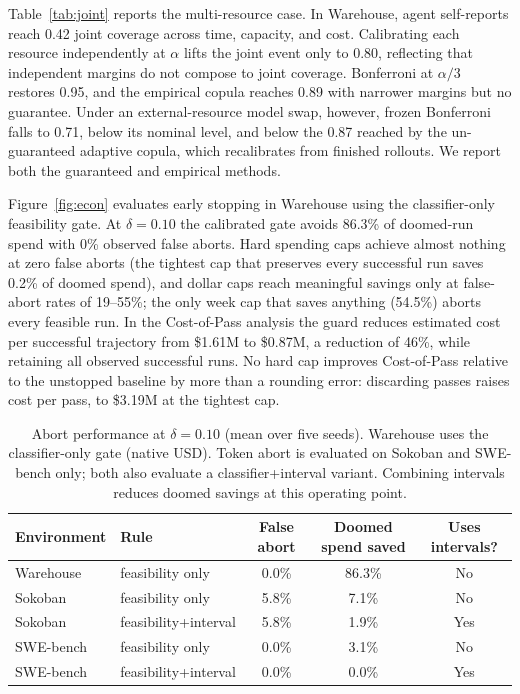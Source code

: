 \documentclass{article}
\begin{document}
Table~\ref{tab:joint} reports the multi-resource case. In Warehouse, agent self-reports reach 0.42 joint coverage across time, capacity, and cost. Calibrating each resource independently at $\alpha$ lifts the joint event only to 0.80, reflecting that independent margins do not compose to joint coverage. Bonferroni at $\alpha/3$ restores 0.95, and the empirical copula reaches 0.89 with narrower margins but no guarantee. Under an external-resource model swap, however, frozen Bonferroni falls to 0.71, below its nominal level, and below the 0.87 reached by the un-guaranteed adaptive copula, which recalibrates from finished rollouts. We report both the guaranteed and empirical methods.

Figure~\ref{fig:econ} evaluates early stopping in Warehouse using the classifier-only feasibility gate. At $\delta{=}0.10$ the calibrated gate avoids 86.3\% of doomed-run spend with 0\% observed false aborts. Hard spending caps achieve almost nothing at zero false aborts (the tightest cap that preserves every successful run saves 0.2\% of doomed spend), and dollar caps reach meaningful savings only at false-abort rates of 19--55\%; the only week cap that saves anything (54.5\%) aborts every feasible run. In the Cost-of-Pass analysis the guard reduces estimated cost per successful trajectory from \$1.61M to \$0.87M, a reduction of 46\%, while retaining all observed successful runs. No hard cap improves Cost-of-Pass relative to the unstopped baseline by more than a rounding error: discarding passes raises cost per pass, to \$3.19M at the tightest cap.

\begin{table}[H]
\centering
\caption{Abort performance at $\delta{=}0.10$ (mean over five seeds). Warehouse uses the classifier-only gate (native USD). Token abort is evaluated on Sokoban and SWE-bench only; both also evaluate a classifier+interval variant. Combining intervals reduces doomed savings at this operating point.}
\label{tab:abort}
\small
\begin{tabular}{@{}llccc@{}}
\toprule
Environment & Rule & False abort & Doomed spend saved & Uses intervals? \\
\midrule
Warehouse & feasibility only & 0.0\% & 86.3\% & No \\
Sokoban & feasibility only & 5.8\% & 7.1\% & No \\
Sokoban & feasibility+interval & 5.8\% & 1.9\% & Yes \\
SWE-bench & feasibility only & 0.0\% & 3.1\% & No \\
SWE-bench & feasibility+interval & 0.0\% & 0.0\% & Yes \\
\bottomrule
\end{tabular}
\end{table}
\end{document}
